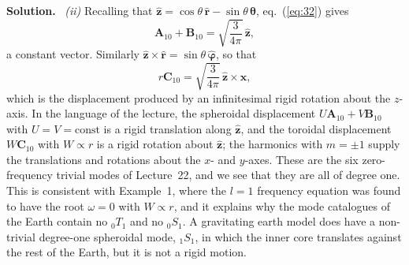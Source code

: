 \documentclass[a4paper,12pt]{paper}
\newenvironment{solution}{\par\noindent\textbf{Solution.}\ }{\par\medskip}
\begin{document}
\begin{solution}
\medskip
\noindent\textit{(ii)} Recalling that $\hat{\mathbf{z}}=\cos\theta\,\hat{\mathbf{r}}-\sin\theta\,\hat{\bm{\theta}}$,
eq.~(\ref{eq:32}) gives
\begin{equation}
\mathbf{A}_{10}+\mathbf{B}_{10}=\sqrt{\frac{3}{4\pi}}\,\hat{\mathbf{z}},
\label{eq:34}
\end{equation}
a constant vector. Similarly $\hat{\mathbf{z}}\times\hat{\mathbf{r}}=\sin\theta\,\hat{\bm{\varphi}}$,
so that
\begin{equation}
r\mathbf{C}_{10}=\sqrt{\frac{3}{4\pi}}\,\hat{\mathbf{z}}\times\mathbf{x},
\label{eq:35}
\end{equation}
which is the displacement produced by an infinitesimal rigid rotation about the $z$-axis.
In the language of the lecture, the spheroidal displacement $U\mathbf{A}_{10}+V\mathbf{B}_{10}$
with $U=V=\mathrm{const}$ is a rigid translation along $\hat{\mathbf{z}}$, and the toroidal
displacement $W\mathbf{C}_{10}$ with $W\propto r$ is a rigid rotation about $\hat{\mathbf{z}}$;
the harmonics with $m=\pm1$ supply the translations and rotations about the $x$- and $y$-axes.
These are the six zero-frequency trivial modes of Lecture~22, and we see that they are all of
degree one. This is consistent with Example~1, where the $l=1$ frequency equation was found to
have the root $\omega=0$ with $W\propto r$, and it explains why the mode catalogues of the
Earth contain no ${}_{0}T_{1}$ and no ${}_{0}S_{1}$. A gravitating earth model does have a
non-trivial degree-one spheroidal mode, ${}_{1}S_{1}$, in which the inner core translates
against the rest of the Earth, but it is not a rigid motion.
\end{solution}
\end{document}
